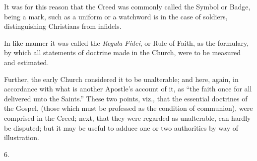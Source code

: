 It was for this reason that the Creed was commonly called the
Symbol or Badge, being a mark, such as a uniform or a watchword is in
the case of soldiers, distinguishing Christians from infidels.

In like manner it was called the \emph{Regula Fidei}, or Rule of
Faith, as the formulary, by which all statements of doctrine made in
the Church, were to be measured and estimated.

Further, the early Church considered it to be unalterable; and
here, again, in accordance with what is another Apostle's account of
it, as ``the faith once for all delivered unto the Saints.''
These two points, viz., that the essential doctrines of the Gospel,
(those which must be professed as the condition of communion), were
comprised in the Creed; next, that they were regarded as unalterable,
can hardly be disputed; but it may be useful to adduce one or two
authorities by way of illustration.

6.

